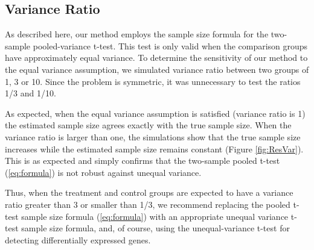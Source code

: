 \documentclass{bioinfo}
\begin{document}
\subsection{Variance Ratio}

As described here, our method employs the sample size formula for
the two-sample pooled-variance t-test.  This test
is only valid when the comparison groups have approximately equal
variance. To determine the sensitivity of our method to the equal
variance assumption, we simulated variance ratio between two groups
of 1, 3 or 10.  Since the problem is symmetric, it was unnecessary
to test the ratios 1/3 and 1/10.

As expected, when the equal variance assumption is satisfied
(variance ratio is 1) the estimated sample size agrees exactly
with the true sample size. When the variance ratio is larger than
one, the simulations show that the true sample size increases
while the estimated sample size remains constant (Figure
\ref{fig:ResVar}).   This is as expected and simply confirms that
the two-sample pooled t-test (\ref{eq:formula}) is not robust
against unequal variance.

Thus, when the treatment and control groups are expected to have a
variance ratio greater than 3 or smaller than 1/3, we recommend
replacing the pooled t-test sample size formula (\ref{eq:formula})
with an appropriate unequal variance t-test sample size formula,
and, of course, using the unequal-variance t-test for detecting
differentially expressed genes.
\end{document}
